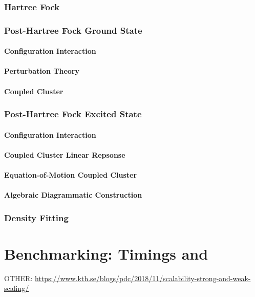 \documentclass{article}
\begin{document}
\section{Hartree Fock}

\section{Post-Hartree Fock Ground State}

\subsection{Configuration Interaction}

\subsection{Perturbation Theory}

\subsection{Coupled Cluster}

\section{Post-Hartree Fock Excited State}

\subsection{Configuration Interaction}

\subsection{Coupled Cluster Linear Repsonse}

\subsection{Equation-of-Motion Coupled Cluster}

\subsection{Algebraic Diagrammatic Construction}

\section{Density Fitting}



\part{Benchmarking: Timings and }

OTHER: \url{https://www.kth.se/blogs/pdc/2018/11/scalability-strong-and-weak-scaling/}
\end{document}
